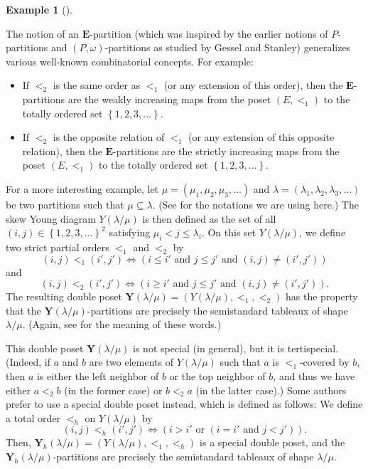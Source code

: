 \documentclass[numbers=enddot,12pt,final,onecolumn,notitlepage,abstracton]{scrartcl}%
\theoremstyle{definition}
\newtheorem{exam}[theo]{Example}
\newenvironment{example}[1][]
{\begin{exam}[#1]\begin{leftbar}}
{\end{leftbar}\end{exam}}
\newcommand{\EE}{{\mathbf{E}}}
\begin{document}
\begin{example}
\label{exam.dp}
The notion of an $\EE$-partition (which was inspired by the earlier
notions of $P$-partitions and $\left(P,\omega\right)$-partitions
as studied by Gessel and Stanley\footnotemark)
generalizes various well-known
combinatorial concepts. For example:
\begin{itemize}
\item If $<_2$ is the same order
as $<_1$ (or any extension of this order), then the
$\EE$-partitions are the weakly increasing maps from the poset
$\left(E, <_1\right)$ to the totally ordered set
$\left\{1, 2, 3, \ldots\right\}$.
\item If $<_2$ is the opposite relation of
$<_1$ (or any extension of this opposite relation), then the
$\EE$-partitions are the strictly increasing maps from the
poset $\left(E, <_1\right)$ to the totally ordered set
$\left\{1, 2, 3, \ldots\right\}$.
\end{itemize}

For a more interesting example,
let $\mu = \left(\mu_1, \mu_2, \mu_3, \ldots\right)$ and
$\lambda = \left(\lambda_1, \lambda_2, \lambda_3, \ldots\right)$ be
two partitions such that $\mu \subseteq \lambda$.
(See \cite[\S 2]{Reiner} for the notations we are using
here.)
The skew Young
diagram $Y\left(\lambda / \mu\right)$ is then defined as the set of all
$\left(i, j\right) \in \left\{ 1, 2, 3, \ldots \right\}^2$ satisfying
$\mu_i < j \leq \lambda_i$. On this set $Y\left(\lambda / \mu\right)$,
we define two strict partial orders $<_1$ and $<_2$ by
\[
\left(i,j\right) <_1 \left(i',j'\right) \Longleftrightarrow
\left( i \leq i' \text{ and } j \leq j' \text{ and }
\left(i,j\right) \neq \left(i',j'\right) \right)
\]
and
\[
\left(i,j\right) <_2 \left(i',j'\right) \Longleftrightarrow
\left( i \geq i' \text{ and } j \leq j' \text{ and }
\left(i,j\right) \neq \left(i',j'\right) \right) .
\]
The resulting double poset
$\mathbf{Y}\left(\lambda / \mu\right)
= \left(Y\left(\lambda / \mu\right), <_1, <_2\right)$ has the
property that the $\mathbf{Y}\left(\lambda / \mu\right)$-partitions
are precisely the semistandard tableaux of shape
$\lambda / \mu$. (Again, see \cite[\S 2]{Reiner} for the meaning
of these words.)

This double poset $\mathbf{Y}\left(\lambda / \mu\right)$
is not special (in general), but it is tertispecial. (Indeed,
if $a$ and $b$ are two elements of $Y\left(\lambda / \mu\right)$
such that $a$ is $<_1$-covered by $b$, then $a$ is either the left
neighbor of $b$ or the top neighbor of $b$, and thus we have
either $a <_2 b$ (in the former case) or $b <_2 a$ (in the latter
case).) Some authors prefer to use a special double poset instead,
which is defined as follows: We define a total
order $<_h$ on $Y\left(\lambda / \mu\right)$ by
\[
\left(i,j\right) <_h \left(i',j'\right) \Longleftrightarrow
\left( i > i' \text{ or } \left( i = i' \text{ and }
j < j' \right) \right) .
\]
Then, $\mathbf{Y}_h\left(\lambda / \mu\right)
= \left(Y\left(\lambda / \mu\right), <_1, <_h\right)$ is a special
double poset, and the
$\mathbf{Y}_h\left(\lambda / \mu\right)$-partitions
are precisely the semistandard tableaux of shape
$\lambda / \mu$.
\end{example}
\end{document}
